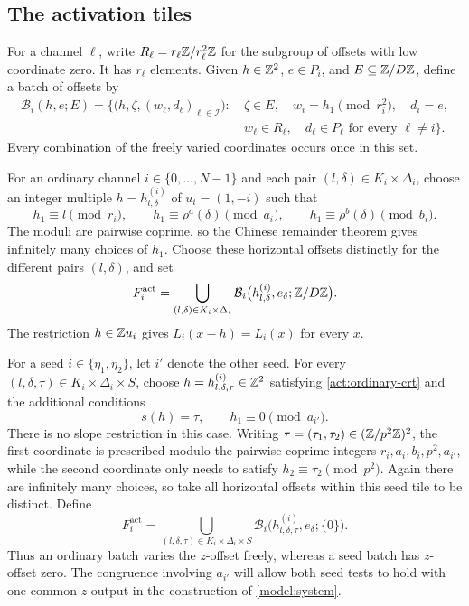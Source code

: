 \subsection{The activation tiles}

For a channel $\ell$, write
$R_\ell=r_\ell\mathbb Z/r_\ell^2\mathbb Z$ for the subgroup of offsets with low
coordinate zero.  It has $r_\ell$ elements.  Given $h\in\mathbb Z^2$,
$e\in P_i$, and $E\subseteq\mathbb Z/D\mathbb Z$, define a batch of offsets by
\[
\begin{split}
 \mathcal B_i(h,e;E)=
 \bigl\{\bigl(h,\zeta,(w_\ell,d_\ell)_{\ell\in\mathcal I}\bigr):
 &\ \zeta\in E,\quad
 w_i=h_1\pmod{r_i^2},\quad d_i=e,\\[-2pt]
 &\ w_\ell\in R_\ell,\quad d_\ell\in P_\ell
       \text{ for every }\ell\ne i\bigr\}.
\end{split}
\]
Every combination of the freely varied coordinates occurs once in this
set.

For an ordinary channel $i\in\{0,\ldots,N-1\}$ and each pair
$(l,\delta)\in K_i\times\Delta_i$, choose an integer multiple
$h=h^{(i)}_{l,\delta}$ of $u_i=(1,-i)$ such that
\begin{equation}
\label{act:ordinary-crt}
 h_1\equiv l\pmod{r_i},\qquad
 h_1\equiv\rho^a(\delta)\pmod{a_i},\qquad
 h_1\equiv\rho^b(\delta)\pmod{b_i}.
\end{equation}
The moduli are pairwise coprime, so the Chinese remainder theorem gives
infinitely many choices of $h_1$.  Choose these horizontal offsets
distinctly for the different pairs $(l,\delta)$, and set
\[
 F_i^{\mathrm{act}}
 =\bigcup_{(l,\delta)\in K_i\times\Delta_i}
    \mathcal B_i\bigl(h^{(i)}_{l,\delta},e_\delta;\mathbb Z/D\mathbb Z\bigr).
\]
The restriction $h\in\mathbb Z u_i$ gives $L_i(x-h)=L_i(x)$ for every $x$.

For a seed $i\in\{\eta_1,\eta_2\}$, let $i'$ denote the other seed.
For every $(l,\delta,\tau)\in K_i\times\Delta_i\times S$, choose
$h=h^{(i)}_{l,\delta,\tau}\in\mathbb Z^2$ satisfying
\cref{act:ordinary-crt} and the additional conditions
\begin{equation}
\label{act:seed-crt}
 s(h)=\tau,\qquad h_1\equiv0\pmod{a_{i'}}.
\end{equation}
There is no slope restriction in this case.  Writing
$\tau=(\tau_1,\tau_2)\in(\mathbb Z/p^2\mathbb Z)^2$, the first coordinate is
prescribed modulo the pairwise coprime integers
$r_i,a_i,b_i,p^2,a_{i'}$, while the second coordinate only needs to
satisfy $h_2\equiv\tau_2\pmod{p^2}$.  Again there are infinitely many
choices, so take all horizontal offsets within this seed tile to be
distinct.  Define
\[
 F_i^{\mathrm{act}}
 =\bigcup_{(l,\delta,\tau)\in K_i\times\Delta_i\times S}
    \mathcal B_i\bigl(h^{(i)}_{l,\delta,\tau},e_\delta;\{0\}\bigr).
\]
Thus an ordinary batch varies the $z$-offset freely, whereas a seed batch
has $z$-offset zero.  The congruence involving $a_{i'}$ will allow both
seed tests to hold with one common $z$-output in the construction of
\cref{model:system}.

